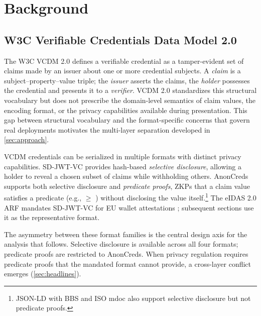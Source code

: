 \section{Background}\label{sec:background}

\subsection{W3C Verifiable Credentials Data Model 2.0}\label{sec:vcdm}

The W3C \acf{VCDM} 2.0 \citep{sporny_verifiable_2025} defines a verifiable credential as a tamper-evident set of claims made by an issuer about one or more credential subjects. A \emph{claim} is a subject--property--value triple; the \emph{issuer} asserts the claims, the \emph{holder} possesses the credential and presents it to a \emph{verifier}. VCDM 2.0 standardizes this structural vocabulary but does not prescribe the domain-level semantics of claim values, the encoding format, or the privacy capabilities available during presentation. This gap between structural vocabulary and the format-specific concerns that govern real deployments motivates the multi-layer separation developed in \autoref{sec:approach}.

VCDM credentials can be serialized in multiple formats with distinct privacy capabilities. SD-JWT-VC \citep{terbu_sd-jwt-based_2026} provides hash-based \emph{selective disclosure}, allowing a holder to reveal a chosen subset of claims while withholding others. AnonCreds \citep{curran2022anoncreds} supports both selective disclosure and \emph{predicate proofs}, \acp{ZKP} that a claim value satisfies a predicate (e.g.,  \(\geq\) ) without disclosing the value itself.\footnote{JSON-LD with BBS \citep{noauthor_verifiable_2024, _bbs_2024} and ISO mdoc \citep{_mobile_2021} also support selective disclosure but not predicate proofs.} The eIDAS 2.0 \ac{ARF} mandates SD-JWT-VC for EU wallet attestations \citep{noauthor_eu-digital-identity-walleteudi-doc-architecture-and-reference-framework_2026}; subsequent sections use it as the representative format.

The asymmetry between these format families is the central design axis for the analysis that follows. Selective disclosure is available across all four formats; predicate proofs are restricted to AnonCreds. When privacy regulation requires predicate proofs that the mandated format cannot provide, a cross-layer conflict emerges (\autoref{sec:headlines}).

